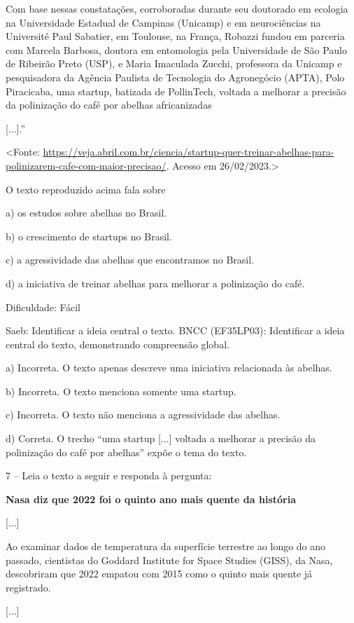 Com base nessas constatações, corroboradas durante seu doutorado em
ecologia na Universidade Estadual de Campinas (Unicamp) e em
neurociências na Université Paul Sabatier, em Toulouse, na França,
Robazzi fundou em parceria com Marcela Barbosa, doutora em entomologia
pela Universidade de São Paulo de Ribeirão Preto (USP), e Maria
Imaculada Zucchi, professora da Unicamp e pesquisadora da Agência
Paulista de Tecnologia do Agronegócio (APTA), Polo Piracicaba, uma
startup, batizada de PollinTech, voltada a melhorar a precisão da
polinização do café por abelhas africanizadas

{[}...{]}.''

\textless{}Fonte:
\url{https://veja.abril.com.br/ciencia/startup-quer-treinar-abelhas-para-polinizarem-cafe-com-maior-precisao/}.
Acesso em 26/02/2023.\textgreater{}

O texto reproduzido acima fala sobre

a) os estudos sobre abelhas no Brasil.

b) o crescimento de startups no Brasil.

c) a agressividade das abelhas que encontramos no Brasil.

d) a iniciativa de treinar abelhas para melhorar a polinização do café.

Dificuldade: Fácil

Saeb: Identificar a ideia central o texto. BNCC (EF35LP03): Identificar
a ideia central do texto, demonstrando compreensão global.

a) Incorreta. O texto apenas descreve uma iniciativa relacionada às
abelhas.

b) Incorreta. O texto menciona somente uma startup.

c) Incorreta. O texto não menciona a agressividade das abelhas.

d) Correta. O trecho ``uma startup {[}...{]} voltada a melhorar a
precisão da polinização do café por abelhas'' expõe o tema do texto.

7 -- Leia o texto a seguir e responda à pergunta:

\textbf{Nasa diz que 2022 foi o quinto ano mais quente da história}

{[}...{]}

Ao examinar dados de temperatura da superfície terrestre ao longo do ano
passado, cientistas do Goddard Institute for Space Studies (GISS), da
Nasa, descobriram que 2022 empatou com 2015 como o quinto mais quente já
registrado.

{[}...{]}

